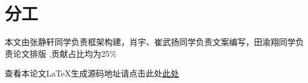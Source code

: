\documentclass{article}
\begin{document}
\printbibliography
\section{分工}
本文由张静轩同学负责框架构建，肖宇、崔武扬同学负责文案编写，田渝翔同学负责论文排版
,贡献占比均为25\%

查看本论文LaTeX生成源码地址请点击此处\href{https://github.com/Fully-ripe-mango/Mycode/new/main}{此处}
\end{document}
